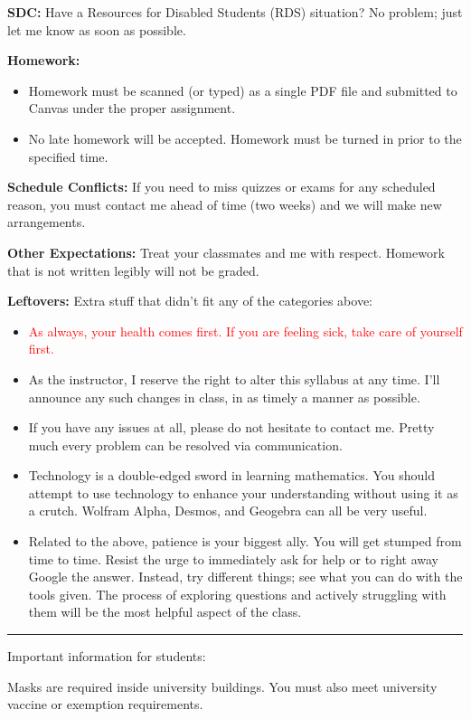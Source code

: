 \documentclass[12pt]{amsbook}
\begin{document}
\textbf{SDC:} Have a Resources for Disabled Students (RDS) situation? No problem; just let me know as soon as possible.

\textbf{Homework:}
\begin{itemize}
    \item Homework must be scanned (or typed) as a single PDF file and submitted to Canvas under the proper assignment.
    \item No late homework will be accepted.  Homework must be turned in prior to the specified time.
\end{itemize}

\textbf{Schedule Conflicts:} If you need to miss quizzes or exams for any scheduled reason, you must contact me ahead of time (two weeks) and we will make new arrangements.

\textbf{Other Expectations:} Treat your classmates and me with respect. Homework that is not written legibly will not be graded.

\textbf{Leftovers:} Extra stuff that didn't fit any of the categories above:
\begin{itemize}
\item \textcolor{red}{As always, your health comes first.  If you are feeling sick, take care of yourself first.}
\item As the instructor, I reserve the right to alter this syllabus at any time. I'll announce any such changes in class, in as timely a manner as possible.
\item If you have any issues at all, please do not hesitate to contact me. Pretty much every  problem can be resolved via communication.
\item Technology is a double-edged sword in learning mathematics. You should attempt to use technology to enhance your understanding without using it as a crutch. Wolfram Alpha, Desmos, and Geogebra can all be very useful.
\item Related to the above, patience is your biggest ally. You will get stumped from time to time. Resist the urge to immediately ask for help or to right away Google the answer. Instead, try different things; see what you can do with the tools given. The process of exploring questions and actively struggling with them will be the most helpful aspect of the class.
\end{itemize}
\vspace*{1cm}
\hrule
Important information for students:

Masks are required inside university buildings. You must also meet university vaccine or exemption requirements.
\end{document}
